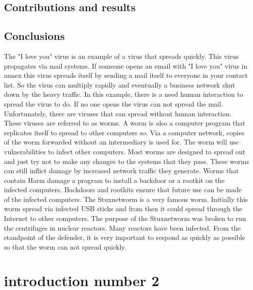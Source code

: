 \subsection{Contributions and results}
\subsection{Conclusions}
The "I love you" virus is an example of a virus that spreads quickly. This virus propagates via mail systems. If someone opens an email with "I love you" virus in annex this virus spreads itself by sending a mail itself to everyone in your contact list. So the virus can multiply rapidly and eventually a business network shut down by the heavy traffic. In this example, there is a need human interaction to spread the virus to do. If no one opens the virus can not spread the mail.
Unfortunately, there are viruses that can spread without human interaction. These viruses are referred to as worms. A worm is also a computer program that replicates itself to spread to other computers so. Via a computer network, copies of the worm forwarded without an intermediary is used for. The worm will use vulnerabilities to infect other computers.
Most worms are designed to spread out and just try not to make any changes to the systems that they pass. These worms can still inflict damage by increased network traffic they generate. Worms that contain Harm damage a program to install a backdoor or a rootkit on the infected computers. Backdoors and rootkits ensure that future use can be made of the infected computers.
The Stuxnetworm is a very famous worm. Initially this worm spread via infected USB sticks and from then it could spread through the Internet to other computers. The purpose of the Stuxnetworm was broken to run the centrifuges in nuclear reactors. Many reactors have been infected. From the standpoint of the defender, it is very important to respond as quickly as possible so that the worm can not spread quickly.

\section{introduction number 2}


